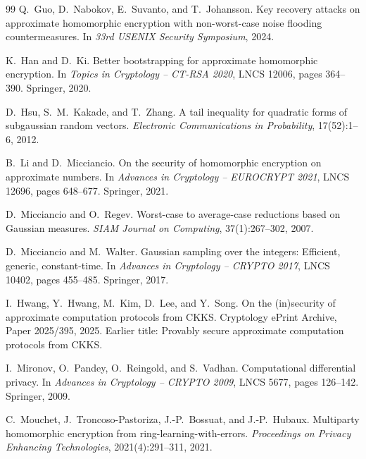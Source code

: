 \begin{thebibliography}{99}
Q.~Guo, D.~Nabokov, E.~Suvanto, and T.~Johansson.
\newblock Key recovery attacks on approximate homomorphic encryption with non-worst-case noise flooding countermeasures.
\newblock In \emph{33rd USENIX Security Symposium}, 2024.

K.~Han and D.~Ki.
\newblock Better bootstrapping for approximate homomorphic encryption.
\newblock In \emph{Topics in Cryptology -- CT-RSA 2020}, LNCS 12006, pages 364--390. Springer, 2020.

D.~Hsu, S.~M.~Kakade, and T.~Zhang.
\newblock A tail inequality for quadratic forms of subgaussian random vectors.
\newblock \emph{Electronic Communications in Probability}, 17(52):1--6, 2012.

B.~Li and D.~Micciancio.
\newblock On the security of homomorphic encryption on approximate numbers.
\newblock In \emph{Advances in Cryptology -- EUROCRYPT 2021}, LNCS 12696, pages 648--677. Springer, 2021.

D.~Micciancio and O.~Regev.
\newblock Worst-case to average-case reductions based on Gaussian measures.
\newblock \emph{SIAM Journal on Computing}, 37(1):267--302, 2007.

D.~Micciancio and M.~Walter.
\newblock Gaussian sampling over the integers: Efficient, generic, constant-time.
\newblock In \emph{Advances in Cryptology -- CRYPTO 2017}, LNCS 10402, pages 455--485. Springer, 2017.

I.~Hwang, Y.~Hwang, M.~Kim, D.~Lee, and Y.~Song.
\newblock On the (in)security of approximate computation protocols from {CKKS}.
\newblock Cryptology ePrint Archive, Paper 2025/395, 2025. Earlier title: Provably secure approximate computation protocols from {CKKS}. 

I.~Mironov, O.~Pandey, O.~Reingold, and S.~Vadhan.
\newblock Computational differential privacy.
\newblock In \emph{Advances in Cryptology -- CRYPTO 2009}, LNCS 5677, pages 126--142. Springer, 2009.

C.~Mouchet, J.~Troncoso-Pastoriza, J.-P.~Bossuat, and J.-P.~Hubaux.
\newblock Multiparty homomorphic encryption from ring-learning-with-errors.
\newblock \emph{Proceedings on Privacy Enhancing Technologies}, 2021(4):291--311, 2021.

\end{thebibliography}


